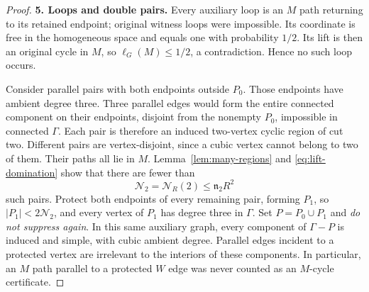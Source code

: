 \documentclass[11pt,a4paper]{article}
\numberwithin{equation}{section}
\theoremstyle{definition}
\theoremstyle{remark}
\newcommand{\proofstep}[1]{\par\addvspace{\medskipamount}\noindent\textbf{#1}\enspace\ignorespaces}
\begin{document}
\begin{proof}
\proofstep{5. Loops and double pairs.}
Every auxiliary loop is an $M$ path returning to its retained endpoint; original witness loops were impossible. Its coordinate is free in the homogeneous space and equals one with probability $1/2$. Its lift is then an original cycle in $M$, so $\ell_G(M)\le1/2$, a contradiction. Hence no such loop occurs.

Consider parallel pairs with both endpoints outside $P_0$. Those endpoints have ambient degree three. Three parallel edges would form the entire connected component on their endpoints, disjoint from the nonempty $P_0$, impossible in connected $\Gamma$. Each pair is therefore an induced two-vertex cyclic region of cut two. Different pairs are vertex-disjoint, since a cubic vertex cannot belong to two of them. Their paths all lie in $M$. Lemma~\ref{lem:many-regions} and \eqref{eq:lift-domination} show that there are fewer than
\begin{equation}\label{eq:M2}
 \mathcal N_2=\mathcal N_R(2)\le \mathfrak n_2R^2
\end{equation}
such pairs. Protect both endpoints of every remaining pair, forming $P_1$, so $|P_1|<2\mathcal N_2$, and every vertex of $P_1$ has degree three in $\Gamma$. Set $P=P_0\cup P_1$ and \emph{do not suppress again}. In this same auxiliary graph, every component of $\Gamma-P$ is induced and simple, with cubic ambient degree. Parallel edges incident to a protected vertex are irrelevant to the interiors of these components. In particular, an $M$ path parallel to a protected $W$ edge was never counted as an $M$-cycle certificate.


\end{proof}
\end{document}
